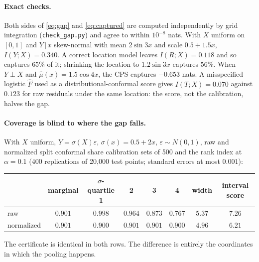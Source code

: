 \documentclass[11pt]{article}
\theoremstyle{definition}
\newcommand{\given}{\,\vert\,}
\begin{document}
\paragraph{Exact checks.} Both sides of \eqref{eq:gap} and \eqref{eq:captured} are computed
independently by grid integration (\texttt{check\_gap.py}) and agree to within $10^{-8}$
nats. With $X$ uniform on $[0,1]$ and $Y\given x$ skew-normal with mean $2\sin3x$ and scale
$0.5+1.5x$, $I(Y;X)=0.340$. A correct location model leaves $I(R;X)=0.118$ and so captures
$65\%$ of it; shrinking the location to $1.2\sin3x$ captures $56\%$. When $Y\perp X$ and
$\hat\mu(x)=1.5\cos4x$, the CPS captures $-0.653$ nats. A misspecified logistic $\hat F$
used as a distributional-conformal score gives $I(T;X)=0.070$ against $0.123$ for raw
residuals under the same location: the score, not the calibration, halves the gap.

\paragraph{Coverage is blind to where the gap falls.} With $X$ uniform, $Y=\sigma(X)
\varepsilon$, $\sigma(x)=0.5+2x$, $\varepsilon\sim N(0,1)$, raw and normalized split
conformal share calibration sets of 500 and the rank index at $\alpha=0.1$ (400
replications of 20,000 test points; standard errors at most $0.001$):
\begin{center}
\small
\begin{tabular}{lccccccc}
\toprule
 & marginal & $\sigma$-quartile 1 & 2 & 3 & 4 & width & interval score\\
\midrule
raw & $0.901$ & $0.998$ & $0.964$ & $0.873$ & $0.767$ & $5.37$ & $7.26$\\
normalized & $0.901$ & $0.900$ & $0.901$ & $0.901$ & $0.900$ & $4.96$ & $6.21$\\
\bottomrule
\end{tabular}
\end{center}
The certificate is identical in both rows. The difference is entirely the coordinates in
which the pooling happens.
\end{document}
